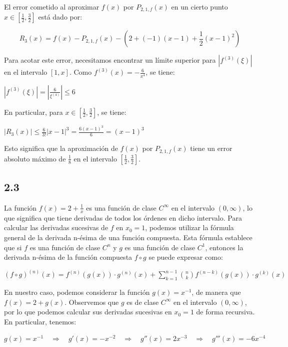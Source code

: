 \documentclass[12pt]{article}
\begin{document}
        El error cometido al aproximar $f(x)$ por $P_{2,1,f}(x)$ en un cierto punto $x \in \left[\frac{1}{2}, \frac{3}{2}\right]$ está dado por:
        
        \begin{equation}
          
          R_{3}(x)= f(x)-P_{2,1,f}(x)- (2+(-1)(x-1)+\frac{1}{2}(x-1)^2)

        \end{equation}

        Para acotar este error, necesitamos encontrar un límite superior para $|f^{(3)}(\xi)|$ en el intervalo $[1, x]$. Como $f^{(3)}(x) = -\frac{6}{x^4}$, se tiene:

        $|f^(3)(ξ)| = |\frac{6}{ξ^(4)}|\leq6$

        En particular, para $x \in \left[\frac{1}{2}, \frac{3}{2}\right]$, se tiene:

        $|R_{3}(x)| \leq \frac{6}{3!}|x-1|^3 = \frac{6(x-1)^3}{6}= (x-1)^3$

        Esto significa que la aproximación de $f(x)$ por $P_{2,1,f}(x)$ tiene un error absoluto máximo de $\frac{1}{8}$ en el intervalo $\left[\frac{1}{2}, \frac{3}{2}\right]$.

      \subsection{2.3}
      
      La función $f(x) = 2+\frac{1}{x}$ es una función de clase $C^{\infty}$ en el intervalo $(0,\infty)$, lo que significa que tiene derivadas de todos los órdenes en dicho intervalo. Para calcular las derivadas sucesivas de $f$ en $x_0=1$, podemos utilizar la fórmula general de la derivada n-ésima de una función compuesta. Esta fórmula establece que si $f$ es una función de clase $C^n$ y $g$ es una función de clase $C^1$, entonces la derivada n-ésima de la función compuesta $f \circ g$ se puede expresar como:

      $(f \circ g)^{(n)}(x) = f^{(n)}(g(x))\cdot g^{(n)}(x) + \sum_{k=1}^{n-1} \binom{n}{k} f^{(n-k)}(g(x)) \cdot g^{(k)}(x)$
      
      En nuestro caso, podemos considerar la función $g(x) = x^{-1}$, de manera que $f(x) = 2+g(x)$. Observemos que $g$ es de clase $C^{\infty}$ en el intervalo $(0,\infty)$, por lo que podemos calcular sus derivadas sucesivas en $x_0=1$ de forma recursiva. En particular, tenemos:
      
      $g(x) = x^{-1} \quad \Rightarrow \quad g'(x) = -x^{-2} \quad \Rightarrow \quad g''(x) = 2x^{-3} \quad \Rightarrow \quad g'''(x) = -6x^{-4}$
      
\end{document}
